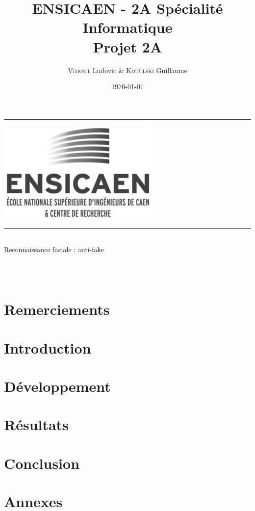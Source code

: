 \documentclass[a4paper]{report}
\title{ENSICAEN - 2A Spécialité Informatique\\Projet 2A}
\author{\textsc{Vimont} Ludovic \& \textsc{Kotulski} Guillaume}
\date{\today}
\newcommand{\HRule}{\rule{\linewidth}{0.5mm}}
\begin{document}
\begin{titlepage}
	\begin{center}
		\vspace*{\fill}
		\textsc{\Large \@title } 
		\HRule
		\vspace{1.5cm}
		\begin{center}
			\includegraphics[width=0.6\textwidth]{data/logo.png}
		\end{center}
		\vspace{1.5cm}
		\HRule \\
		\Large{Reconnaissance faciale : anti-fake}\\

		\large{\@author} \\
		\vspace*{\fill}

		 \\
		\@date
	\end{center}
\end{titlepage}

\chapter*{Remerciements}


\setcounter{tocdepth}{4}
\renewcommand{\contentsname}{Sommaire} 
\tableofcontents

\chapter{Introduction}


\chapter{Développement}


\chapter{Résultats}


\chapter{Conclusion}


\appendix
\chapter{Annexes}

\end{document}
